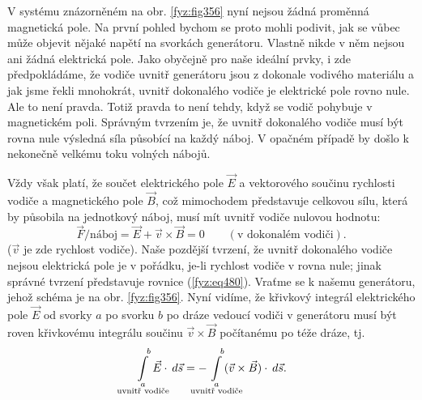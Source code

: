   V systému znázorněném na obr. \ref{fyz:fig356} nyní nejsou žádná proměnná magnetická pole. Na 
  první pohled bychom se proto mohli podivit, jak se vůbec může objevit nějaké napětí na svorkách 
  generátoru. Vlastně nikde v něm nejsou ani žádná elektrická pole. Jako obyčejně pro naše ideální 
  prvky, i zde předpokládáme, že vodiče uvnitř generátoru jsou z dokonale vodivého materiálu a jak 
  jsme řekli mnohokrát, uvnitř dokonalého vodiče je elektrické pole rovno nule. Ale to není pravda. 
  Totiž pravda to není tehdy, když se vodič pohybuje v magnetickém poli. Správným tvrzením je, že 
  uvnitř dokonalého vodiče musí být rovna nule výsledná síla působící na každý náboj. V opačném 
  případě by došlo k nekonečně velkému toku volných nábojů.
  
  Vždy však platí, že součet elektrického pole \(\vec{E}\) a vektorového součinu rychlosti vodiče a 
  magnetického pole \(\vec{B}\), což mimochodem představuje celkovou sílu, která by působila na 
  jednotkový náboj, musí mít uvnitř vodiče nulovou hodnotu:
  \begin{equation}\label{fyz:eq480}
   \vec{F}/\text{náboj} = \vec{E} + \vec{v}\times\vec{B} = 0\qquad(\text{v dokonalém vodiči}).
  \end{equation}
  (\(\vec{v}\) je zde rychlost vodiče). Naše pozdější tvrzení, že uvnitř dokonalého vodiče nejsou 
  elektrická pole je v pořádku, je-li rychlost vodiče v rovna nule; jinak správné tvrzení 
  představuje rovnice (\ref{fyz:eq480}). Vraťme se k našemu generátoru, jehož schéma je na obr. 
  \ref{fyz:fig356}. Nyní vidíme, že křivkový integrál elektrického pole \(\vec{E}\) od svorky \(a\) 
  po svorku \(b\) po dráze vedoucí vodiči v generátoru musí být roven křivkovému integrálu součinu 
  \(\vec{v}\times\vec{B}\) počítanému po téže dráze, tj.
  \begin{equation}\label{fyz:eq481}
       \limitint_{\mathclap{\substack{a\\\text{uvnitř vodiče}}}}^{\quad b}\vec{E}\cdot\dd{\vec{s}} =
     - \limitint_{\mathclap{\substack{a\\\text{uvnitř vodiče}}}}^{\quad b} 
                                   (\vec{v}\times\vec{B})\cdot\dd{\vec{s}}.
  \end{equation}

